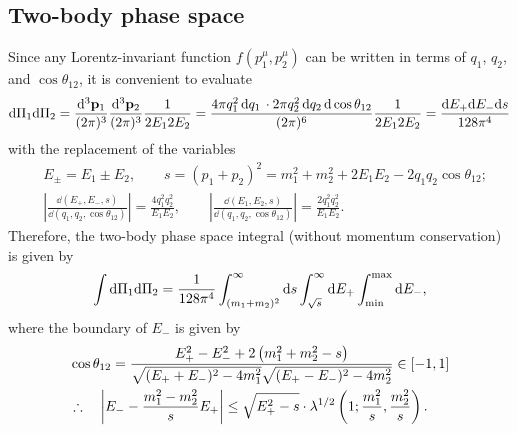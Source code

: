\documentclass[CheatSheet]{subfiles}
\begin{document}
\subsection{Two-body phase space}
Since any Lorentz-invariant function $f(p_1^\mu,p_2^\mu)$ can be written in terms of $q_1$, $q_2$, and $\cos\theta_{12}$, it is convenient to evaluate
\begin{equation}
 \dd\Pi_1\dd\Pi_2
=
\ddP{p_1}\ddP{p_2}\frac{1}{2E_12E_2}
=
\frac{4\pi q_1^2\,\dd q_1\,\cdot 2\pi q_2^2\,\dd q_2\,\dd\cos\theta_{12}}{(2\pi)^6}
\frac{1}{2E_12E_2}
=
\frac{\dd E_+\dd E_- \dd s}{128\pi^4}
\end{equation}
with the replacement of the variables
\begin{align*}
& E_\pm = E_1\pm E_2,
\qquad
s=(p_1+p_2)^2=m_1^2 + m_2^2 + 2E_1E_2 - 2q_1 q_2\cos\theta_{12};\\
&
\left|\frac{\dd(E_+,E_-,s)}{\dd(q_1, q_2, \cos\theta_{12})}\right|=\frac{4q_1^2q_2^2}{E_1E_2},
\qquad
\left|\frac{\dd(E_1,E_2,s)}{\dd(q_1, q_2, \cos\theta_{12})}\right|=\frac{2q_1^2q_2^2}{E_1E_2}.
\end{align*}
Therefore, the two-body phase space integral (without momentum conservation) is given by
\begin{equation}
 \int\dd\Pi_1\dd\Pi_2
=
\frac{1}{128\pi^4}
\int_{(m_1+m_2)^2}^\infty\dd s
\int_{\sqrt{s}}^\infty\dd E_+
\int\w{min}^{\mathrm{max}}\dd E_-,
\end{equation}
where the boundary of $E_-$ is given by
\begin{align*}
 &\cos\theta_{12}=\frac{E_+^2-E_-^2+2 \left(m_1^2+m_2^2-s\right)}{\sqrt{(E_++E_-)^2-4 m_1^2}\sqrt{(E_+-E_-)^2-4 m_2^2}} \in [-1,1]\\
 &\therefore\quad
\left|E_- - \frac{m_1^2-m_2^2}{s}E_+\right| 
\le
\sqrt{E_+^2-s}\cdot\Kallen[1/2]\left(1;\frac{m_1^2}{s},\frac{m_2^2}{s}\right).
\end{align*}
\end{document}
